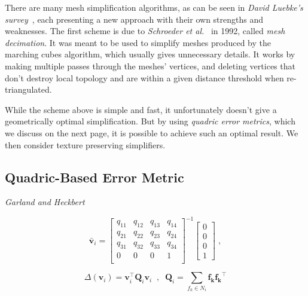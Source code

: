 There are many mesh simplification algorithms, as can be seen in \emph{David Luebke's survey}~\cite{luebke2001developer}, each presenting a new approach with their own strengths and weaknesses. The first scheme is due to \emph{Schroeder et al.}~\cite{schroeder1992decimation} in 1992, called \emph{mesh decimation}. It was meant to be used to simplify meshes produced by the marching cubes algorithm, which usually gives unnecessary details. It works by making multiple passes through the meshes' vertices, and deleting vertices that don't destroy local topology and are within a given distance threshold when re-triangulated.

While the scheme above is simple and fast, it unfortunately doesn't give a geometrically optimal simplification. But by using \emph{quadric error metrics}, which we discuss on the next page, it is possible to achieve such an optimal result. We then consider texture preserving simplifiers.

\subsection{Quadric-Based Error Metric} \label{sec:quadric-based_error_metric}

\emph{Garland and Heckbert}~\cite{garland1998simplifying}

\[\bar{\mathbf{v}}_i = \begin{bmatrix}
    q_{11} & q_{12} & q_{13} & q_{14}\\
    q_{21} & q_{22} & q_{23} & q_{24}\\
    q_{31} & q_{32} & q_{33} & q_{34}\\
    0 & 0 & 0 & 1\\
\end{bmatrix}^{-1} \begin{bmatrix} 0 \\
                                   0 \\
                                   0 \\
                                   1 \end{bmatrix} \; ,\]

\[\Delta(\mathbf{v}_i) = \mathbf{v}_i^\intercal \mathbf{Q}_i  \mathbf{v}_i \;\;,\;\; \mathbf{Q}_i = \sum_{f_k \in N_i}  \mathbf{f_k} \mathbf{f_k}^\intercal\]

